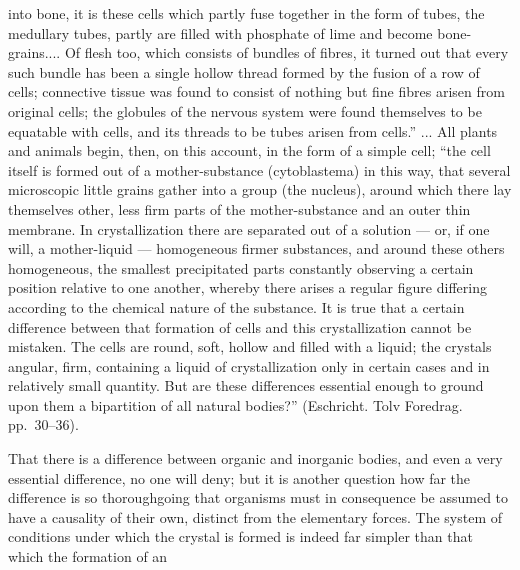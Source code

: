 \documentclass[12pt,a4paper]{book}
\begin{document}
into bone, it is these cells which partly fuse together in the form of tubes,
the medullary tubes, partly are filled with phosphate of lime and become
bone-grains.... Of flesh too, which consists of bundles of fibres, it turned
out that every such bundle has been a single hollow thread formed by the fusion
of a row of cells; connective tissue was found to consist of nothing but fine
fibres arisen from original cells; the globules of the nervous system were
found themselves to be equatable with cells, and its threads to be tubes arisen
from cells.'' ... All plants and animals begin, then, on this account, in the
form of a simple cell; ``the cell itself is formed out of a mother-substance
(cytoblastema) in this way, that several microscopic little grains gather into
a group (the nucleus), around which there lay themselves other, less firm parts
of the mother-substance and an outer thin membrane. In crystallization there
are separated out of a solution --- or, if one will, a mother-liquid ---
homogeneous firmer substances, and around these others homogeneous, the
smallest precipitated parts constantly observing a certain position relative to
one another, whereby there arises a regular figure differing according to the
chemical nature of the substance. It is true that a certain difference between
that formation of cells and this crystallization cannot be mistaken. The cells
are round, soft, hollow and filled with a liquid; the crystals angular, firm,
containing a liquid of crystallization only in certain cases and in relatively
small quantity. But are these differences essential enough to ground upon them
a bipartition of all natural bodies?'' (Eschricht. Tolv Foredrag.
pp.~30--36).

That there is a difference between organic and inorganic bodies, and even a
very essential difference, no one will deny; but it is another question how far
the difference is so thoroughgoing that organisms must in consequence be
assumed to have a causality of their own, distinct from the elementary forces.
The system of conditions under which the crystal is formed is indeed far
simpler than that which the formation of an
\end{document}
